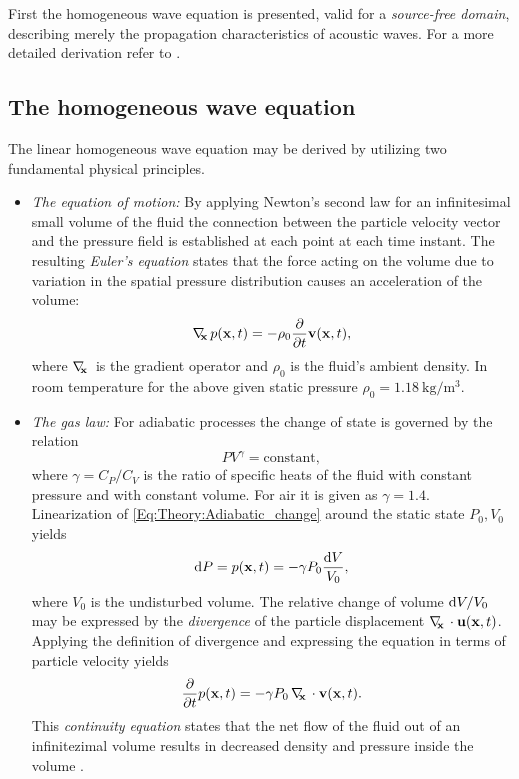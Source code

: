 First the homogeneous wave equation is presented, valid for a \emph{source-free domain}, describing merely the propagation characteristics of acoustic waves.
For a more detailed derivation refer to \cite{Beranek1993, Morse1968, Williams1999, Blackstock2000}.

\subsection{The homogeneous wave equation}
%
The linear homogeneous wave equation may be derived by utilizing two fundamental physical principles.
\begin{itemize}
\item \emph{The equation of motion:} By applying Newton's second law for an infinitesimal small volume of the fluid the connection between the particle velocity vector and the pressure field is established at each point at each time instant. 
The resulting \emph{Euler's equation} states that the force acting on the volume due to variation in the spatial pressure distribution causes an acceleration of the volume:
\begin{equation}
\nabla_{\!\!\mathbf{x}}\, p(\mathbf{x},t) = -\rho_0 \frac{\partial}{\partial t} \mathbf{v}(\mathbf{x},t),
\label{Eq:Theory:Eulers_equation}
\end{equation}
where $\nabla_{\!\!\mathbf{x}}\,$ is the gradient operator and $\rho_0$ is the fluid's ambient density. 
In room temperature for the above given static pressure $\rho_0 = 1.18~\mathrm{kg}/\mathrm{m}^3$.

\item \emph{The gas law:} For adiabatic processes the change of state is governed by the relation
\begin{equation}
P V^{\gamma} = \mathrm{constant},
\label{Eq:Theory:Adiabatic_change}
\end{equation}
where $\gamma = C_P/C_V$ is the ratio of specific heats of the fluid with constant pressure and with constant volume.
For air it is given as $\gamma = 1.4$.
Linearization of \eqref{Eq:Theory:Adiabatic_change} around the static state $P_0, V_0$ yields
\begin{equation}
\mathrm{d} P = p(\mathbf{x},t) = -\gamma P_0 \frac{\mathrm{d} V}{V_0},
\end{equation}
where $V_0$ is the undisturbed volume. 
The relative change of volume $\mathrm{d} V / V_0$ may be expressed by the  \emph{divergence} of the particle displacement $\nabla_{\!\!\mathbf{x}}\, \cdot \mathbf{u}(\mathbf{x},t)$. 
Applying the definition of divergence and expressing the equation in terms of particle velocity yields
\begin{equation}
\frac{\partial}{\partial t} p(\mathbf{x},t) = -\gamma P_0 \, \nabla_{\!\!\mathbf{x}}\, \cdot \mathbf{v}(\mathbf{x},t).
\label{Eq:Theory:continuity_eq}
\end{equation}
This \emph{continuity equation} states that the net flow of the fluid out of an infinitezimal volume results in decreased density and pressure inside the volume \cite{Arfken2005}.
\end{itemize}
